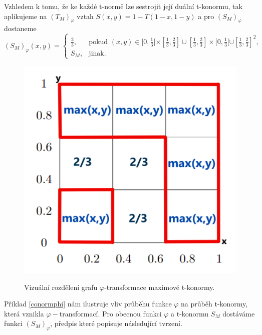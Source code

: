 \begin{example}
    \label{conormphi}
    Vzhledem k tomu, \v ze ke ka\v zd\'e t-norm\v e lze sestrojit jej\'i du\'aln\'i t-konormu, tak aplikujeme na $\left(T_M\right)_\varphi$ vztah $S(x,y)=1-T(1-x,1-y)$ a pro $\left(S_M\right)_\varphi$ dostaneme
 $$(S_M)_\varphi(x,y) = \begin{cases} \frac{2}{3}, & \mbox {pokud } (x,y) \in [0,\frac{1}{3}[\times[\frac{1}{3},\frac{2}{3}] \cup [\frac{1}{3},\frac{2}{3}]\times[0,\frac{1}{3}[ \cup [\frac{1}{3},\frac{2}{3}]^2,
    \\ S_M, & \mbox {jinak. }
    \end{cases}$$

\begin{figure}[H]
\caption{Vizu\' aln\' i rozd\v elen\'i grafu $\varphi$-transformace maximové t-konormy.}
\centering
\includegraphics[scale=0.61]{template-fig/phi-t-conorm.pdf}
    \label{graph: max-conorm}
\end{figure}

\end{example}
Příklad \ref{conormphi} nám ilustruje vliv průběhu funkce $\varphi$ na průběh t-konormy, která vznikla $\varphi-$transformací. Pro obecnou funkci $\varphi$ a t-konormu $S_M$ dostáváme funkci $(S_M)_{\varphi}$, předpis které popisuje následující tvrzení.

